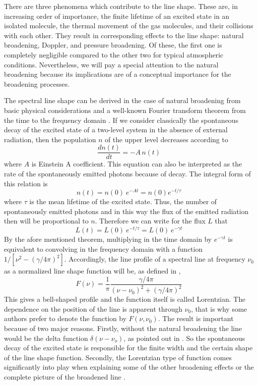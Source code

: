 There are three phenomena which contribute to the line shape. These
are, in increasing order of importance, the finite lifetime of an
excited state in an isolated molecule, the thermal movement of the gas
molecules, and their collisions with each other. They result in
corresponding effects to the line shape: natural broadening, Doppler,
and pressure broadening. Of these, the first one is completely
negligible compared to the other two for typical atmospheric
conditions. Nevertheless, we will pay a special attention to the
natural broadening because its implications are of a conceptual
importance for the broadening processes.

The spectral line shape can be derived in the case of natural
broadening from basic physical considerations and a well-known Fourier
transform theorem from the time to the frequency domain \citep{thorne:99}. If we
consider classically the spontaneous decay of the excited state of a
two-level system in the absence of external radiation, then the population
$n$ of the upper level decreases according to
\begin{equation}\label{eq:abs_theory:spon_decay_diff}
  \frac{dn(t)}{dt} = -A\,n(t)
\end{equation}
where $A$ is Einstein A coefficient. This equation can also be
interpreted as the rate of the spontaneously emitted photons because
of decay. The integral form of this relation is 
\begin{equation}\label{eq:abs_theory:spon_decay_exp}
  n(t)=n(0)~e^{-At}=n(0)e^{-t/\tau}
\end{equation}
where $ \tau$ is the mean lifetime of the excited state. Thus, the
number of spontaneously emitted photons and in this way the flux of
the emitted radiation then will be proportional to $n$. Therefore we
can write for the flux $L$ that
\begin{equation}\label{eq:abs_theory:flux}
  L(t)=L(0)~e^{-t/ \tau}=L(0)~e^{-\gamma t}
\end{equation}
By the afore mentioned theorem, multiplying in the time domain by
$e^{-\gamma t}$ is equivalent to convolving in the frequency domain
with a function $1/[\nu^2 - (\gamma/4\pi)^2]$. Accordingly, the line
profile of a spectral line at frequency $ \nu_0$ as a normalized
line shape function will be, as defined in \citet{thorne:99},
\begin{equation}\label{eq:abs_theory:natural_lorentz}
  F(\nu)=\frac{1}{\pi}\frac{\gamma/4\pi}{(\nu - \nu_0)^2 + (\gamma/4\pi)^2}
\end{equation}
This gives a bell-shaped profile and the function itself is called
Lorentzian. The dependence on the position of the line is apparent
through $\nu_0$, that is why some authors prefer to denote the
function by $F(\nu,\nu_0)$.  The result is important because of two
major reasons.  Firstly, without the natural broadening the line would
be the delta function $\delta (\nu - \nu_o)$, as pointed out in
\citet{bernath:95}. So the spontaneous decay of the excited state is
responsible for the finite width and the certain shape of the
line shape function. Secondly, the Lorentzian type of function comes
significantly into play when explaining some of the other broadening
effects or the complete picture of the broadened line \citep{thorne:99}.

